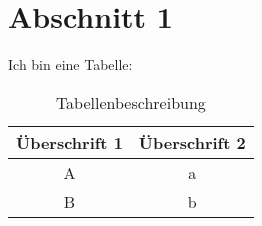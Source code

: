 

\section{Abschnitt 1}\label{sec:abschnitt_1}

Ich bin eine Tabelle:

\begin{table}[H]
    \begin{center}
        \begin{tabular}{|c || c|}
            \hline
            \textbf{Überschrift 1} & \textbf{Überschrift 2} \\
            \hline
            \hline
            A                      & a                      \\
            \hline
            B                      & b                      \\
            \hline
        \end{tabular}
        \caption{Tabellenbeschreibung}
        \label{tab:table_1}
    \end{center}
\end{table}
